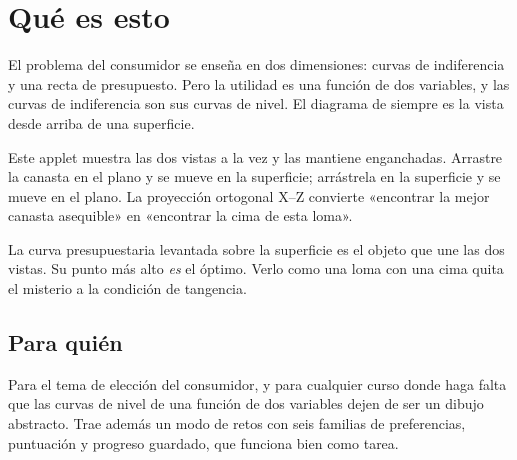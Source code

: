 \documentclass[11pt,a4paper]{appletmanual}
\begin{document}

\manualtoc
\thispagestyle{empty}
\clearpage
\setcounter{page}{1}

\section{Qué es esto}

El problema del consumidor se enseña en dos dimensiones: curvas de indiferencia
y una recta de presupuesto. Pero la utilidad es una función de dos variables, y
las curvas de indiferencia son sus curvas de nivel. El diagrama de siempre es
la vista desde arriba de una superficie.

Este applet muestra las dos vistas a la vez y las mantiene enganchadas. Arrastre
la canasta en el plano y se mueve en la superficie; arrástrela en la superficie
y se mueve en el plano. La proyección ortogonal X--Z convierte «encontrar la
mejor canasta asequible» en «encontrar la cima de esta loma».


\begin{amkey}
La curva presupuestaria levantada sobre la superficie es el objeto que une las
dos vistas. Su punto más alto \emph{es} el óptimo. Verlo como una loma con una
cima quita el misterio a la condición de tangencia.
\end{amkey}

\subsection{Para quién}

Para el tema de elección del consumidor, y para cualquier curso donde haga
falta que las curvas de nivel de una función de dos variables dejen de ser un
dibujo abstracto. Trae además un modo de retos con seis familias de
preferencias, puntuación y progreso guardado, que funciona bien como tarea.


\end{document}
